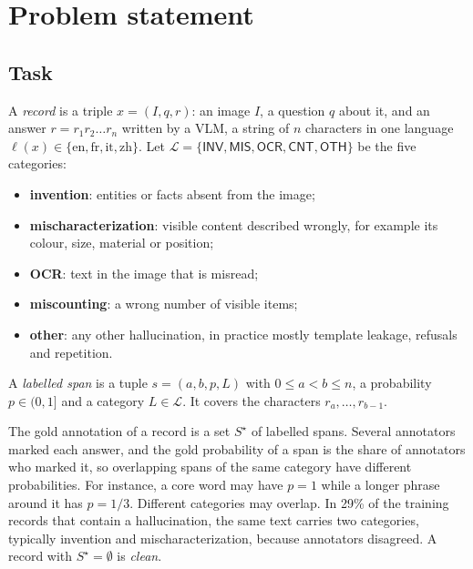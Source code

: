 \chapter{Problem statement}\label{chap:problem}

\section{Task}

A \emph{record} is a triple $x = (I, q, r)$: an image $I$, a question $q$ about it, and an answer $r = r_1 r_2 \dots r_n$ written by a VLM, a string of $n$ characters in one language $\ell(x) \in \{\mathrm{en}, \mathrm{fr}, \mathrm{it}, \mathrm{zh}\}$. Let $\mathcal{L} = \{\textsf{INV}, \textsf{MIS}, \textsf{OCR}, \textsf{CNT}, \textsf{OTH}\}$ be the five categories:
\begin{itemize}
    \item \textbf{invention}: entities or facts absent from the image;
    \item \textbf{mischaracterization}: visible content described wrongly, for example its colour, size, material or position;
    \item \textbf{OCR}: text in the image that is misread;
    \item \textbf{miscounting}: a wrong number of visible items;
    \item \textbf{other}: any other hallucination, in practice mostly template leakage, refusals and repetition.
\end{itemize}

\begin{Def}
A \emph{labelled span} is a tuple $s = (a, b, p, L)$ with $0 \le a < b \le n$, a probability $p \in (0, 1]$ and a category $L \in \mathcal{L}$. It covers the characters $r_a, \dots, r_{b-1}$.
\end{Def}

The gold annotation of a record is a set $S^\star$ of labelled spans. Several annotators marked each answer, and the gold probability of a span is the share of annotators who marked it, so overlapping spans of the same category have different probabilities. For instance, a core word may have $p = 1$ while a longer phrase around it has $p = 1/3$. Different categories may overlap. In 29\% of the training records that contain a hallucination, the same text carries two categories, typically invention and mischaracterization, because annotators disagreed. A record with $S^\star = \emptyset$ is \emph{clean}.

